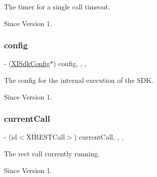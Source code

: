The timer for a single call timeout. 

\begin{DoxySince}{Since}
Version 1. 
\end{DoxySince}
\hypertarget{category_x_i_robust_r_e_s_t_call_07_08_a8ac7eacb7f3346f88d205472982f08fe}{}\label{category_x_i_robust_r_e_s_t_call_07_08_a8ac7eacb7f3346f88d205472982f08fe} 
\subsubsection{\texorpdfstring{config}{config}}
{\footnotesize\ttfamily -\/ (\hyperlink{class_x_i_sdk_config}{X\+I\+Sdk\+Config}$\ast$) config\hspace{0.3cm}{\ttfamily [read]}, {\ttfamily [write]}, {\ttfamily [nonatomic]}, {\ttfamily [strong]}}



The config for the internal execution of the S\+DK. 

\begin{DoxySince}{Since}
Version 1. 
\end{DoxySince}
\hypertarget{category_x_i_robust_r_e_s_t_call_07_08_af87b849dcdb3ead87e53fa2f747ee3ab}{}\label{category_x_i_robust_r_e_s_t_call_07_08_af87b849dcdb3ead87e53fa2f747ee3ab} 
\subsubsection{\texorpdfstring{current\+Call}{currentCall}}
{\footnotesize\ttfamily -\/ (id$<$X\+I\+R\+E\+S\+T\+Call$>$) current\+Call\hspace{0.3cm}{\ttfamily [read]}, {\ttfamily [write]}, {\ttfamily [nonatomic]}, {\ttfamily [strong]}}



The rect call currently running. 

\begin{DoxySince}{Since}
Version 1. 
\end{DoxySince}
\hypertarget{category_x_i_robust_r_e_s_t_call_07_08_a91411757abcf912073f533c900dd57bf}{}\label{category_x_i_robust_r_e_s_t_call_07_08_a91411757abcf912073f533c900dd57bf} 
